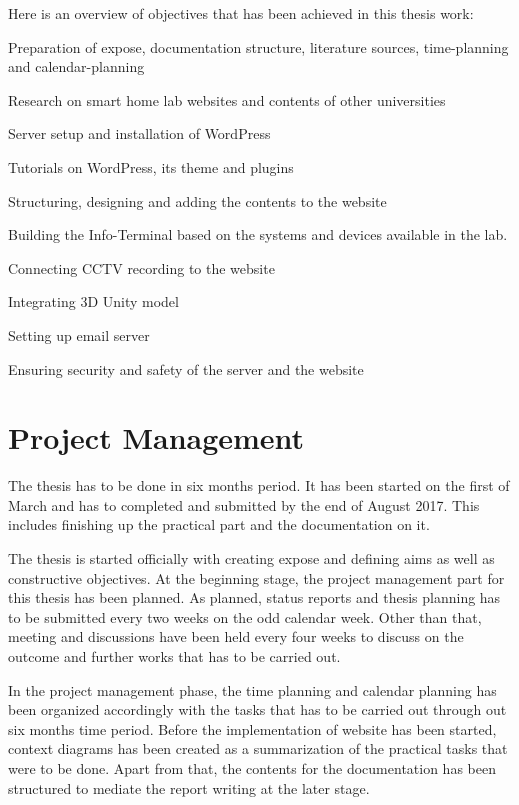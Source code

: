 Here is an overview of objectives that has been achieved in this thesis work:
\begin{itemize*}
\item Preparation of expose, documentation structure, literature sources, time-planning and calendar-planning
\item Research on smart home lab websites and contents of other universities
\item Server setup and installation of WordPress
\item Tutorials on WordPress, its theme and plugins
\item Structuring, designing and adding the contents to the website
\item Building the Info-Terminal based on the systems and devices available in the lab.
\item Connecting CCTV recording to the website
\item Integrating 3D Unity model
\item Setting up email server
\item Ensuring security and safety of the server and the website
\end{itemize*}

\section{Project Management}
The thesis has to be done in six months period. It has been started on the first of March and has to completed and submitted by the end of August 2017. This includes finishing up the practical part and the documentation on it.

The thesis is started officially with creating expose and defining aims as well as constructive objectives. At the beginning stage, the project management part for this thesis has been planned. As planned, status reports and thesis planning has to be submitted every two weeks on the odd calendar week. Other than that, meeting and discussions have been held every four weeks to discuss on the outcome and further works that has to be carried out.

In the project management phase, the time planning and calendar planning has been organized accordingly with the tasks that has to be carried out through out six months time period. Before the implementation of website has been started, context diagrams has been created as a summarization of the practical tasks that were to be done. Apart from that, the contents for the documentation has been structured to mediate the report writing at the later stage.

